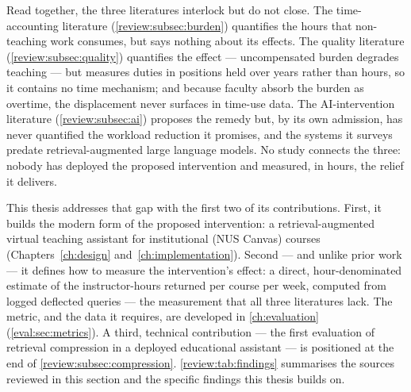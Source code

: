Read together, the three literatures interlock but do not close. The
time-accounting literature (\autoref{review:subsec:burden}) quantifies the
hours that non-teaching work consumes, but says nothing about its effects.
The quality literature (\autoref{review:subsec:quality}) quantifies the
effect --- uncompensated burden degrades teaching --- but measures duties in
positions held over years rather than hours, so it contains no time
mechanism; and because faculty absorb the burden as overtime, the displacement
never surfaces in time-use data. The AI-intervention literature
(\autoref{review:subsec:ai}) proposes the remedy but, by its own admission,
has never quantified the workload reduction it promises, and the systems it
surveys predate retrieval-augmented large language models. No study connects
the three: nobody has deployed the proposed intervention and measured, in
hours, the relief it delivers.

This thesis addresses that gap with the first two of its contributions.
First, it builds the
modern form of the proposed intervention: a retrieval-augmented virtual
teaching assistant for institutional (NUS Canvas) courses
(Chapters~\ref{ch:design} and~\ref{ch:implementation}). Second --- and unlike
prior work --- it defines how to measure the intervention's effect: a direct,
hour-denominated estimate of the instructor-hours returned per course per
week, computed from logged deflected queries --- the measurement that all
three literatures lack. The metric, and the data it requires, are developed
in \autoref{ch:evaluation} (\autoref{eval:sec:metrics}). A third, technical contribution --- the first
evaluation of retrieval compression in a deployed educational assistant ---
is positioned at the end of \autoref{review:subsec:compression}.
\autoref{review:tab:findings} summarises the
sources reviewed in this section and the specific findings this thesis builds
on.

